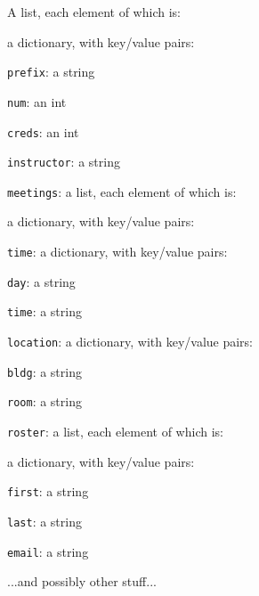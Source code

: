 A list, each element of which is:
\vspace{-.1in}
\begin{compactitem}
\item a dictionary, with key/value pairs:
        \begin{compactitem}
        \item \texttt{prefix}: a string
        \item \texttt{num}: an int
        \item \texttt{creds}: an int
        \item \texttt{instructor}: a string
        \item \texttt{meetings}: a list, each element of which is:
            \begin{compactitem}
            \item a dictionary, with key/value pairs:
                \begin{compactitem}
                \item \texttt{time}: a dictionary, with key/value pairs:

\quad\quad \texttt{day}: a string

\quad\quad \texttt{time}: a string

                \item \texttt{location}: a dictionary, with key/value pairs:

\quad\quad \texttt{bldg}: a string

\quad\quad \texttt{room}: a string

                \end{compactitem}
            \end{compactitem}
        \item \texttt{roster}: a list, each element of which is:
            \begin{compactitem}
            \item a dictionary, with key/value pairs:
                \begin{compactitem}
                \item \texttt{first}: a string
                \item \texttt{last}: a string
                \item \texttt{email}: a string
                \end{compactitem}
            \end{compactitem}
        \item ...and possibly other stuff...
        \end{compactitem}
\end{compactitem}

